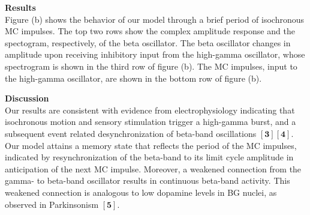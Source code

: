 \documentclass[12pt]{article}
\begin{document}






\clearpage

{\bf Results}\\
\noindent
Figure (b) shows the behavior of our model through a brief period of isochronous MC impulses. The top two rows show the complex amplitude response and the spectogram, respectively, of the beta oscillator. The beta oscillator changes in amplitude upon receiving inhibitory input from the high-gamma oscillator, whose spectrogram is shown in the third row of figure (b). The MC impulses, input to the high-gamma oscillator, are shown in the bottom row of figure (b). 

{\bf Discussion}\\
\noindent
Our results are consistent with evidence from electrophysiology indicating that isochronous motion and sensory stimulation trigger a high-gamma burst, and a subsequent event related desynchronization of beta-band oscillations $\mathbf{[3][4]}$.
Our model attains a memory state that reflects the period of the MC impulses, indicated by resynchronization of the beta-band to its limit cycle amplitude in anticipation of the next MC impulse. Moreover, a weakened connection from the gamma- to beta-band oscillator results in continuous beta-band activity. This weakened connection is analogous to low dopamine levels in BG nuclei, as observed in Parkinsonism $\mathbf{[5]}$.
\end{document}
